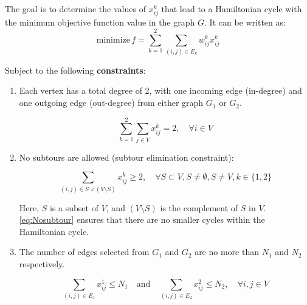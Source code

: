 \documentclass{article} %
\begin{document}
The goal is to determine the values of $x_{ij}^k$ that lead to a Hamiltonian
cycle with the minimum objective function value in the graph $G$. It can be
written as:
\begin{equation*}
  \text{minimize} \, f = \sum_{k=1}^{2} \sum_{(i,j) \in E_k} w_{ij}^k x_{ij}^k
\end{equation*}

Subject to the following \textbf{constraints}:

\begin{enumerate}
  \item Each vertex has a total degree of 2, with one incoming edge (in-degree) and one
        outgoing edge (out-degree) from either graph $G_1$ or $G_2$.

        \begin{equation*}
          \sum_{k=1}^{2} \sum_{j \in V} x_{ij}^k = 2, \quad \forall i \in V
        \end{equation*}
  \item No subtours are allowed (subtour elimination constraint):

        \begin{equation}
          \sum_{(i,j) \in S \times (V \setminus S)} x_{ij}^k \geq 2, \quad \forall S \subset V, S \neq \emptyset, S \neq V, k \in \{1, 2\}\label{eq:Nosubtour}
        \end{equation}

        Here, $S$ is a subset of $V$, and $(V \setminus S)$ is the complement of $S$ in
        $V$.\eqref{eq:Nosubtour} ensures that there are no smaller cycles within the
        Hamiltonian cycle.
  \item The number of edges selected from $G_1$ and $G_2$ are no more than $N_1$ and
        $N_2$ respectively.

        \begin{equation*}
          \sum_{(i,j) \in E_1} x_{ij}^1 \leq N_1 \quad \text{and} \quad \sum_{(i,j) \in E_2} x_{ij}^2 \leq N_2,  \quad \forall i,j \in V
        \end{equation*}
\end{enumerate}
\end{document}
